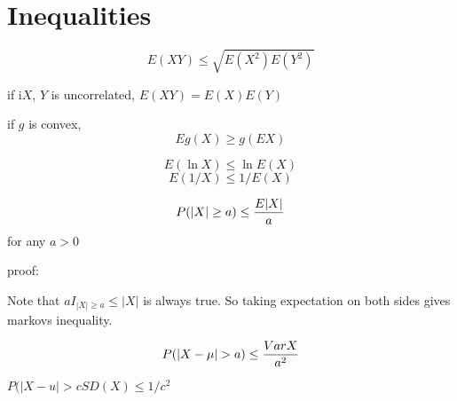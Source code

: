 \section{Inequalities}
\begin{slide}

	$$E(XY) \leq \sqrt{E(X^2)E(Y^2)}$$

if i$X$, $Y$ is uncorrelated, $E(XY) = E(X)E(Y)$

\end{slide}
 
\begin{slide}

if $g$ is convex, $$E g(X) \geq g(EX)$$




$$E(\ln X)\leq \ln E(X)$$
$$E(1/X) \leq 1/E(X)$$
\end{slide}

\begin{slide}

$$P(|X|\geq a) \leq {E|X| \over a }$$ for any $a > 0$


proof:

Note that $a I_{|X|\geq a} \leq |X|$ is always true. So taking expectation on both sides gives markovs inequality.

\end{slide}

\begin{slide}

$$P(|X -\mu| > a) \leq {Var X \over a^2}$$

$P(|X-u| >cSD(X) \leq 1/c^2$

\end{slide}
